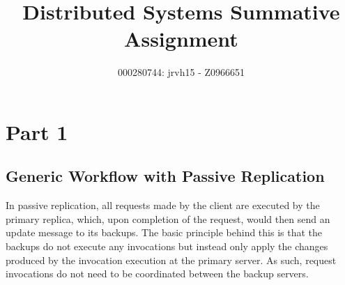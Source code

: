 \documentclass[11pt]{article}
\title{Distributed Systems Summative Assignment}
\author{000280744: jrvh15 - Z0966651}
\begin{document}
\maketitle

\section{Part 1}
\subsection{Generic Workflow with Passive Replication} 
In passive replication, all requests made by the client are executed by the 
primary replica, which, upon completion of the request, would then send an 
update message to its backups. The basic principle behind this is that the 
backups do not execute any invocations but instead only apply the changes 
produced by the invocation execution at the primary server. As such, request 
invocations do not need to be coordinated between the backup servers.
\end{document}
